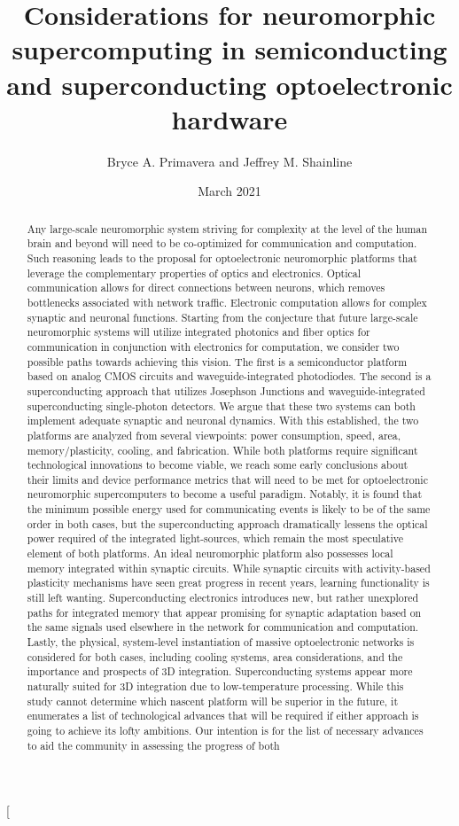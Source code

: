 \documentclass[twocolumn]{article}
\title{\textcolor{OliveGreen}{Considerations for neuromorphic supercomputing in semiconducting and superconducting optoelectronic hardware}}
\author{Bryce A. Primavera and Jeffrey M. Shainline}
\date{March 2021}
\begin{document}
\twocolumn[
\begin{@twocolumnfalse}
\maketitle
\begin{abstract}
Any large-scale neuromorphic system striving for complexity at the level of the human brain and beyond will need to be co-optimized for communication and computation. Such reasoning leads to the proposal for optoelectronic neuromorphic platforms that leverage the complementary properties of optics and electronics. Optical communication allows for direct connections between neurons, which removes bottlenecks associated with network traffic. Electronic computation allows for complex synaptic and neuronal functions. Starting from the conjecture that future large-scale neuromorphic systems will utilize integrated photonics and fiber optics for communication in conjunction with electronics for computation, we consider two possible paths towards achieving this vision. The first is a semiconductor platform based on analog CMOS circuits and waveguide-integrated photodiodes. The second is a superconducting approach that utilizes Josephson Junctions and waveguide-integrated superconducting single-photon detectors. We argue that these two systems can both implement adequate synaptic and neuronal dynamics. With this established, the two platforms are analyzed from several viewpoints: power consumption, speed, area, memory/plasticity, cooling, and fabrication. While both platforms require significant technological innovations to become viable, we reach some early conclusions about their limits and device performance metrics that will need to be met for optoelectronic neuromorphic supercomputers to become a useful paradigm. Notably, it is found that the minimum possible energy used for communicating events is likely to be of the same order in both cases, but the superconducting approach dramatically lessens the optical power required of the integrated light-sources, which remain the most speculative element of both platforms. An ideal neuromorphic platform also possesses local memory integrated within synaptic circuits. While synaptic circuits with activity-based plasticity mechanisms have seen great progress in recent years, learning functionality is still left wanting. Superconducting electronics introduces new, but rather unexplored paths for integrated memory that appear promising for synaptic adaptation based on the same signals used elsewhere in the network for communication and computation. Lastly, the physical, system-level instantiation of massive optoelectronic networks is considered for both cases, including cooling systems, area considerations, and the importance and prospects of 3D integration. Superconducting systems appear more naturally suited for 3D integration due to low-temperature processing. While this study cannot determine which nascent platform will be superior in the future, it enumerates a list of technological advances that will be required if either approach is going to achieve its lofty ambitions. Our intention is for the list of necessary advances to aid the community in assessing the progress of both 
\end{abstract}
\end{@twocolumnfalse}
\end{document}

